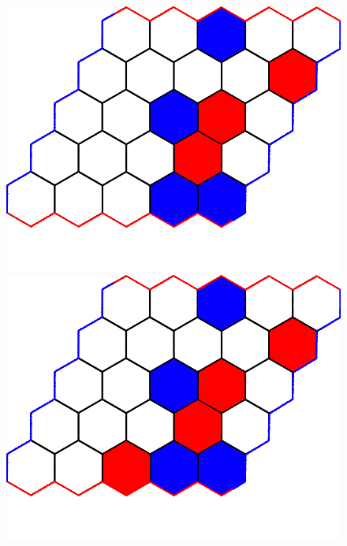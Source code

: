 \documentclass[a4paper]{article}
\begin{document}
\begin{figure}[t]
\begin{minipage}[t]{.24\linewidth}
    \includegraphics[width=\linewidth]{figures/example_game/ex_game_t7.png}
    \end{minipage}
    \begin{minipage}[t]{.24\linewidth}
    \includegraphics[width=\linewidth]{figures/example_game/ex_game_t8.png}
    \end{minipage}
    \begin{minipage}[t]{.24\linewidth}

\end{minipage}
\end{figure}
\end{document}
